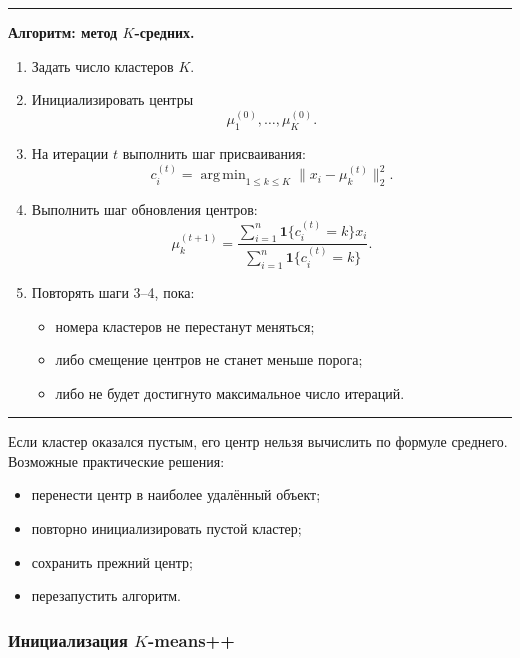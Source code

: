 \documentclass[12pt,a4paper]{article}
\theoremstyle{definition}
\theoremstyle{remark}
\DeclareMathOperator*{\argmin}{arg\,min}
\newenvironment{algorithmbox}[1]
{
    \begin{center}
    \begin{minipage}{0.96\textwidth}
    \hrule
    \medskip
    \textbf{Алгоритм: #1.}
    \par\smallskip
}
{
    \medskip
    \hrule
    \end{minipage}
    \end{center}
}
\begin{document}
\begin{algorithmbox}{метод $K$-средних}
\begin{enumerate}
    \item Задать число кластеров $K$.
    \item Инициализировать центры
          \[
              \mu_1^{(0)},\ldots,\mu_K^{(0)}.
          \]
    \item На итерации $t$ выполнить шаг присваивания:
          \[
              c_i^{(t)}
              =
              \argmin_{1\leq k\leq K}
              \|x_i-\mu_k^{(t)}\|_2^2.
          \]
    \item Выполнить шаг обновления центров:
          \[
              \mu_k^{(t+1)}
              =
              \frac{
                  \sum_{i=1}^{n}
                  \mathbf{1}\{c_i^{(t)}=k\}x_i
              }{
                  \sum_{i=1}^{n}
                  \mathbf{1}\{c_i^{(t)}=k\}
              }.
          \]
    \item Повторять шаги 3--4, пока:
    \begin{itemize}
        \item номера кластеров не перестанут меняться;
        \item либо смещение центров не станет меньше порога;
        \item либо не будет достигнуто максимальное число итераций.
    \end{itemize}
\end{enumerate}
\end{algorithmbox}

Если кластер оказался пустым, его центр нельзя вычислить по формуле среднего.
Возможные практические решения:

\begin{itemize}
    \item перенести центр в наиболее удалённый объект;
    \item повторно инициализировать пустой кластер;
    \item сохранить прежний центр;
    \item перезапустить алгоритм.
\end{itemize}

\subsubsection{Инициализация $K$-means++}
\end{document}
